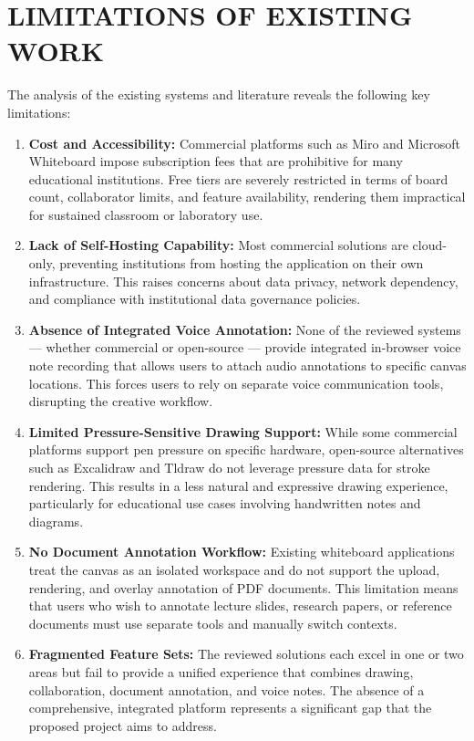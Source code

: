 \documentclass[12pt,a4paper]{report}
\begin{document}
\section{LIMITATIONS OF EXISTING WORK}

The analysis of the existing systems and literature reveals the following key limitations:

\begin{enumerate}[label=\arabic*.]
  \item \textbf{Cost and Accessibility:} Commercial platforms such as Miro and Microsoft Whiteboard impose subscription fees that are prohibitive for many educational institutions. Free tiers are severely restricted in terms of board count, collaborator limits, and feature availability, rendering them impractical for sustained classroom or laboratory use.

  \item \textbf{Lack of Self-Hosting Capability:} Most commercial solutions are cloud-only, preventing institutions from hosting the application on their own infrastructure. This raises concerns about data privacy, network dependency, and compliance with institutional data governance policies.

  \item \textbf{Absence of Integrated Voice Annotation:} None of the reviewed systems --- whether commercial or open-source --- provide integrated in-browser voice note recording that allows users to attach audio annotations to specific canvas locations. This forces users to rely on separate voice communication tools, disrupting the creative workflow.

  \item \textbf{Limited Pressure-Sensitive Drawing Support:} While some commercial platforms support pen pressure on specific hardware, open-source alternatives such as Excalidraw and Tldraw do not leverage pressure data for stroke rendering. This results in a less natural and expressive drawing experience, particularly for educational use cases involving handwritten notes and diagrams.

  \item \textbf{No Document Annotation Workflow:} Existing whiteboard applications treat the canvas as an isolated workspace and do not support the upload, rendering, and overlay annotation of PDF documents. This limitation means that users who wish to annotate lecture slides, research papers, or reference documents must use separate tools and manually switch contexts.

  \item \textbf{Fragmented Feature Sets:} The reviewed solutions each excel in one or two areas but fail to provide a unified experience that combines drawing, collaboration, document annotation, and voice notes. The absence of a comprehensive, integrated platform represents a significant gap that the proposed project aims to address.
\end{enumerate}
\end{document}
